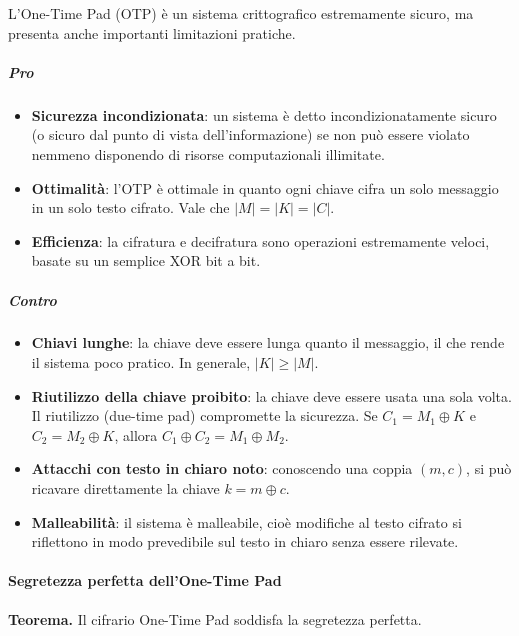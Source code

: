 \documentclass{report}
\begin{document}
L'One-Time Pad (OTP) è un sistema crittografico estremamente sicuro, ma presenta anche importanti limitazioni pratiche.

\subparagraph{Pro}
\begin{itemize}
    \item \textbf{Sicurezza incondizionata}: un sistema è detto incondizionatamente sicuro (o sicuro dal punto di vista dell'informazione) se non può essere violato nemmeno disponendo di risorse computazionali illimitate.
    \item \textbf{Ottimalità}: l'OTP è ottimale in quanto ogni chiave cifra un solo messaggio in un solo testo cifrato. Vale che $|M| = |K| = |C|$.
    \item \textbf{Efficienza}: la cifratura e decifratura sono operazioni estremamente veloci, basate su un semplice XOR bit a bit.
\end{itemize}

\subparagraph{Contro}
\begin{itemize}
    \item \textbf{Chiavi lunghe}: la chiave deve essere lunga quanto il messaggio, il che rende il sistema poco pratico. In generale, $|K| \geq |M|$.
    \item \textbf{Riutilizzo della chiave proibito}: la chiave deve essere usata una sola volta. Il riutilizzo (due-time pad) compromette la sicurezza. Se $C_1 = M_1 \oplus K$ e $C_2 = M_2 \oplus K$, allora $C_1 \oplus C_2 = M_1 \oplus M_2$.
    \item \textbf{Attacchi con testo in chiaro noto}: conoscendo una coppia $(m, c)$, si può ricavare direttamente la chiave $k = m \oplus c$.
    \item \textbf{Malleabilità}: il sistema è malleabile, cioè modifiche al testo cifrato si riflettono in modo prevedibile sul testo in chiaro senza essere rilevate.
\end{itemize}

\paragraph{Segretezza perfetta dell’One-Time Pad}

\textbf{Teorema.} Il cifrario One-Time Pad soddisfa la segretezza perfetta.
\end{document}

